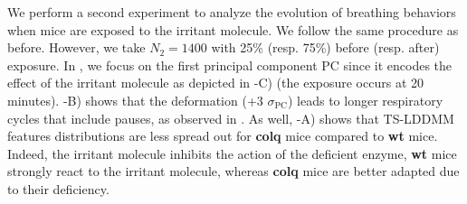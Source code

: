 We perform a second experiment to analyze the evolution of breathing behaviors when mice are exposed to the irritant 
molecule. We follow the same procedure as before. However, we take $N_2=1400$ with 25\% (resp. 75\%) 
before (resp. after) exposure. In , we focus on the first principal component PC since
it encodes the effect of the irritant molecule as depicted in -C) (the exposure occurs at 20 minutes).
-B) shows that the deformation (+3 $\sigma_{\text{PC}}$) leads to longer respiratory cycles that include pauses,
as observed in \cite{germain2023unsupervised}. As well, -A) shows that TS-LDDMM features distributions are less spread 
out for \textbf{colq} mice compared to \textbf{wt} mice. Indeed, the irritant molecule inhibits the action of the 
deficient enzyme, \textbf{wt} mice strongly react to the irritant molecule, whereas \textbf{colq} mice are better 
adapted due to their deficiency.
%



